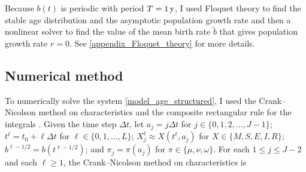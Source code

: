 \documentclass[USenglish]{article}
\begin{document}
Because $b(t)$ is periodic with period $T = \unit[1]{y}$, I used
Floquet theory to find the stable age distribution and the asymptotic
population growth rate and then a nonlinear solver to find the value
of the mean birth rate $\tilde{b}$ that gives population growth rate $r
= 0$. See \autoref{appendix_Floquet_theory} for more details.


\subsection{Numerical method}

To numerically solve the system \eqref{model_age_structured}, I used
the Crank--Nicolson method on characteristics and the composite
rectangular rule for the integrals \autocite{milner_1992}.  Given the
time step $\Delta t$, let
$a_j = j \Delta t$ for $j \in \{0, 1, 2, \ldots, J - 1\}$;
$t^{\ell} = t_0 + \ell \Delta t$ for $\ell \in \{0, 1, \ldots, L\}$;
$X_j^{\ell} \approx X(t^{\ell}, a_j)$ for $X \in \{M, S, E, I, R\}$;
$b^{\ell - 1 / 2} = b(t^{\ell - 1 / 2})$; and
$\pi_j = \pi(a_j)$ for $\pi \in \{\mu, \nu, \omega\}$.
For each $1 \leq j \leq J - 2$ and each $\ell \geq 1$, the
Crank--Nicolson method on characteristics is
\end{document}
